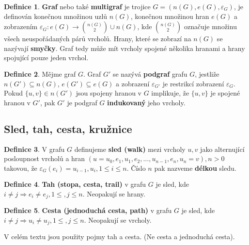 \documentclass[a4]{report}
\theoremstyle{definition}
\newtheorem{definition}{Definice}[section]
\begin{document}
\begin{definition}
\textbf{Graf} nebo také \textbf{multigraf} je trojice $G = (n(G), e(G), \varepsilon_G)$, je definován konečnou množinou uzlů $n(G)$, konečnou množinou hran $e(G)$ a zobrazením $\varepsilon_G : e(G) \rightarrow  { n(G) \choose 2 }  \cup n(G)$, kde ${ n(G) \choose 2 }$ označuje množinu všech neuspořádaných párů vrcholů. Hrany, které se zobrazí na $n(G)$ se nazývají \textbf{smyčky}. Graf tedy může mít vrcholy spojené několika hranami a hrany spojující pouze jeden vrchol.
\end{definition}

\begin{definition}
Mějme graf $G$. Graf $G'$ se nazývá \textbf{podgraf} grafu $G$, jestliže $n(G') \subseteq n(G)$, $e(G') \subseteq e(G)$ a zobrazení $\varepsilon_{G'}$ je restrikcí zobrazení $\varepsilon_G$. Pokud $\{ u, v \} \in n(G')$ jsou spojeny hranou v $G$ implikuje, že $\{ u, v \}$ je spojené hranou v $G'$, pak $G'$ je podgraf $G$ \textbf{indukovaný} jeho vrcholy.
\end{definition}

\subsection{Sled, tah, cesta, kružnice}

\begin{definition}
V grafu $G$ definujeme \textbf{sled (walk)} mezi vrcholy $u,v$ jako alternující posloupnost vrcholů a hran $(u = u_0, e_1, u_1, e_2, \ldots, u_{n-1}, e_n, u_n = v), n > 0$ takovou, že $\varepsilon_G (e_i) = {u_{i-1}, u_i}, 1 \leq i \leq n$. Číslo $n$ pak nazveme \textbf{délkou} sledu.
\end{definition}

\begin{definition}
\textbf{Tah (stopa, cesta, trail)} v grafu $G$ je sled, kde $i\neq j \Rightarrow e_i \neq e_j, 1 \leq , j \leq n $. Neopakují se hrany.
\end{definition}

\begin{definition}
\textbf{Cesta (jednoduchá cesta, path)} v grafu $G$ je sled, kde $i \neq j \Rightarrow u_i \neq u_j, 1 \leq , j \leq n $. Neopakují se vrcholy.
\end{definition}

V celém textu jsou použity pojmy tah a cesta. (Ne cesta a jednoduchá cesta).
\end{document}

